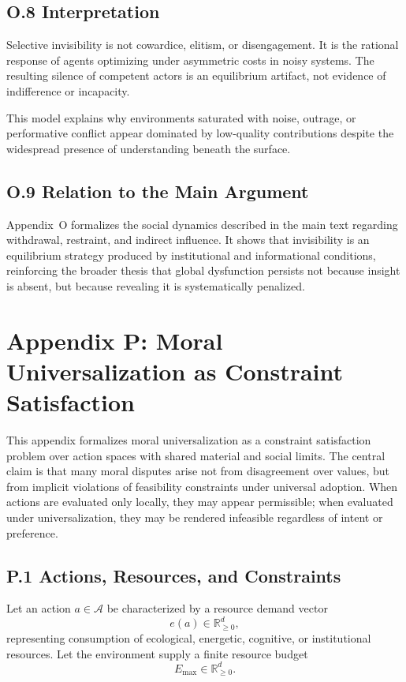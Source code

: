 \documentclass[11pt]{article}
\begin{document}
\subsection{O.8 Interpretation}

Selective invisibility is not cowardice, elitism, or disengagement. It is the rational response of agents optimizing under asymmetric costs in noisy systems. The resulting silence of competent actors is an equilibrium artifact, not evidence of indifference or incapacity.

This model explains why environments saturated with noise, outrage, or performative conflict appear dominated by low-quality contributions despite the widespread presence of understanding beneath the surface.

\subsection{O.9 Relation to the Main Argument}

Appendix~O formalizes the social dynamics described in the main text regarding withdrawal, restraint, and indirect influence. It shows that invisibility is an equilibrium strategy produced by institutional and informational conditions, reinforcing the broader thesis that global dysfunction persists not because insight is absent, but because revealing it is systematically penalized.

\section{Appendix P: Moral Universalization as Constraint Satisfaction}
\label{app:ethics-detailed}

This appendix formalizes moral universalization as a constraint satisfaction problem over action spaces with shared material and social limits. The central claim is that many moral disputes arise not from disagreement over values, but from implicit violations of feasibility constraints under universal adoption. When actions are evaluated only locally, they may appear permissible; when evaluated under universalization, they may be rendered infeasible regardless of intent or preference.

\subsection{P.1 Actions, Resources, and Constraints}

Let an action \(a \in \mathcal{A}\) be characterized by a resource demand vector
\[
e(a) \in \mathbb{R}^d_{\ge 0},
\]
representing consumption of ecological, energetic, cognitive, or institutional resources. Let the environment supply a finite resource budget
\[
E_{\max} \in \mathbb{R}^d_{\ge 0}.
\]
\end{document}
